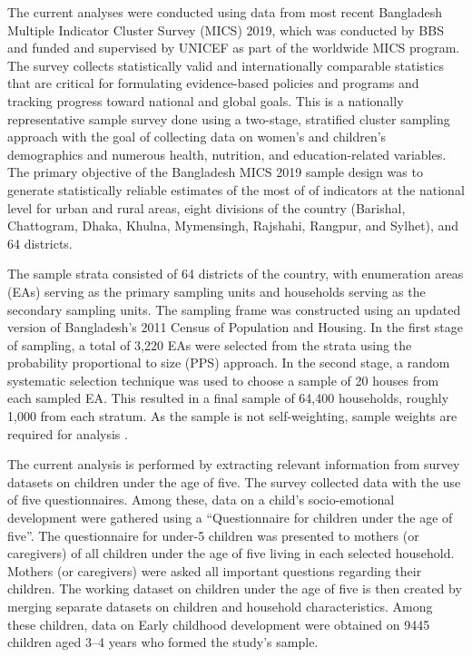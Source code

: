 \documentclass[
  12pt,
  oneside]{report}
\begin{document}
The current analyses were conducted using data from most recent Bangladesh Multiple Indicator Cluster Survey (MICS) 2019, which was conducted by BBS and funded and supervised by UNICEF as part of the worldwide MICS program. The survey collects statistically valid and internationally comparable statistics that are critical for formulating evidence-based policies and programs and tracking progress toward national and global goals. This is a nationally representative sample survey done using a two-stage, stratified cluster sampling approach with the goal of collecting data on women's and children's demographics and numerous health, nutrition, and education-related variables. The primary objective of the Bangladesh MICS 2019 sample design was to generate statistically reliable estimates of the most of of indicators at the national level for urban and rural areas, eight divisions of the country (Barishal, Chattogram, Dhaka, Khulna, Mymensingh, Rajshahi, Rangpur, and Sylhet), and 64 districts.

The sample strata consisted of 64 districts of the country, with enumeration areas (EAs) serving as the primary sampling units and households serving as the secondary sampling units. The sampling frame was constructed using an updated version of Bangladesh's 2011 Census of Population and Housing. In the first stage of sampling, a total of 3,220 EAs were selected from the strata using the probability proportional to size (PPS) approach. In the second stage, a random systematic selection technique was used to choose a sample of 20 houses from each sampled EA. This resulted in a final sample of 64,400 households, roughly 1,000 from each stratum. As the sample is not self-weighting, sample weights are required for analysis \citep{mics}.

The current analysis is performed by extracting relevant information from survey datasets on children under the age of five. The survey collected data with the use of five questionnaires. Among these, data on a child's socio-emotional development were gathered using a ``Questionnaire for children under the age of five''. The questionnaire for under-5 children was presented to mothers (or caregivers) of all children under the age of five living in each selected household. Mothers (or caregivers) were asked all important questions regarding their children. The working dataset on children under the age of five is then created by merging separate datasets on children and household characteristics. Among these children, data on Early childhood development were obtained on 9445 children aged 3--4 years who formed the study's sample.
\end{document}
